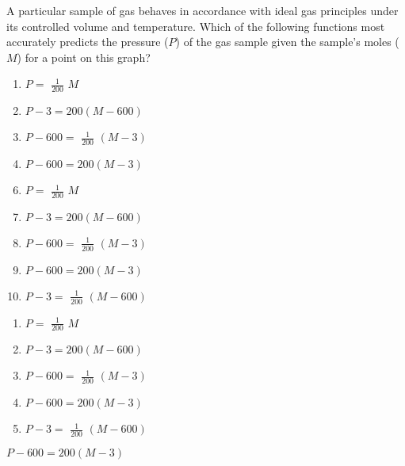  
\begin{center}\end{center}
A particular sample of gas behaves in accordance with ideal gas principles under its controlled volume and temperature.  Which of the following functions most accurately predicts the pressure ($P$) of the gas sample given the sample's moles ($M$) for a point on this graph?


\ifsat
	\begin{enumerate}[label=\Alph*)]
		\item $P=$ {\Large$\frac{1}{200}$} $M$
		\item $P-3=200(M-600)$
		\item $P-600=$ {\Large$\frac{1}{200}$} $(M-3)$
		\item $P-600=200(M-3)$ %
	\end{enumerate}
\else
\fi

\ifacteven
	\begin{enumerate}[label=\textbf{\Alph*.},itemsep=\fill,align=left]
		\setcounter{enumii}{5}
		\item $P=$ {\Large$\frac{1}{200}$} $M$
		\item $P-3=200(M-600)$
		\item $P-600=$ {\Large$\frac{1}{200}$} $(M-3)$
		\addtocounter{enumii}{1}
		\item $P-600=200(M-3)$ %
		\item $P-3=$ {\Large$\frac{1}{200}$} $(M-600) $
	\end{enumerate}
\else
\fi

\ifactodd
	\begin{enumerate}[label=\textbf{\Alph*.},itemsep=\fill,align=left]
		\item $P=$ {\Large$\frac{1}{200}$} $M$
		\item $P-3=200(M-600)$
		\item $P-600=$ {\Large$\frac{1}{200}$} $(M-3)$
		\item $P-600=200(M-3)$ %
		\item $P-3=$ {\Large$\frac{1}{200}$} $(M-600) $
	\end{enumerate}
\else
\fi

\ifgridin
 $P-600=200(M-3)$ %

\else
\fi

